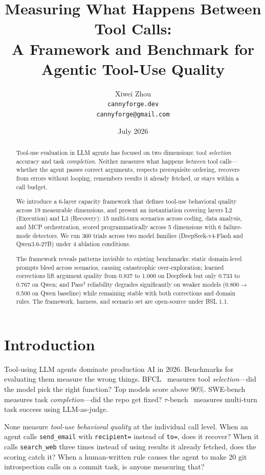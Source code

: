 \documentclass[11pt]{article}
\title{\textbf{Measuring What Happens Between Tool Calls:} \\
       \large A Framework and Benchmark for Agentic Tool-Use Quality}
\author{Xiwei Zhou \\
        \texttt{cannyforge.dev} \\
        \texttt{cannyforge@gmail.com}}
\date{July 2026}
\begin{document}
\maketitle

\begin{abstract}
Tool-use evaluation in LLM agents has focused on two dimensions: tool
\emph{selection} accuracy and task \emph{completion}. Neither measures what
happens \emph{between} tool calls---whether the agent passes correct arguments,
respects prerequisite ordering, recovers from errors without looping, remembers
results it already fetched, or stays within a call budget.

We introduce a 6-layer capacity framework that defines tool-use behavioral
quality across 19 measurable dimensions, and present an instantiation covering
layers L2 (Execution) and L3 (Recovery): 15 multi-turn scenarios across coding,
data analysis, and MCP orchestration, scored programmatically across 5
dimensions with 6 failure-mode detectors. We run 360 trials across two model
families (DeepSeek-v4-Flash and Qwen3.6-27B) under 4 ablation conditions.

The framework reveals patterns invisible to existing benchmarks: static
domain-level prompts bleed across scenarios, causing catastrophic
over-exploration; learned corrections lift argument quality from 0.837 to 1.000
on DeepSeek but only 0.733 to 0.767 on Qwen; and Pass$^3$ reliability
degrades significantly on weaker models (0.800$\rightarrow$0.500 on Qwen
baseline) while remaining stable with both corrections and domain rules. The
framework, harness, and scenario set are open-source under BSL 1.1.
\end{abstract}

\section{Introduction}

Tool-using LLM agents dominate production AI in 2026. Benchmarks for
evaluating them measure the wrong things. BFCL~\cite{bfcl} measures tool
\emph{selection}---did the model pick the right function? Top models score
above 90\%. SWE-bench~\cite{swebench} measures task \emph{completion}---did
the repo get fixed? $\tau$-bench~\cite{taubench} measures multi-turn task
success using LLM-as-judge.

None measure \emph{tool-use behavioral quality} at the individual call level.
When an agent calls \texttt{send\_email} with \texttt{recipient=} instead of
\texttt{to=}, does it recover? When it calls \texttt{search\_web} three times
instead of using results it already fetched, does the scoring catch it? When a
human-written rule causes the agent to make 20 git introspection calls on a
commit task, is anyone measuring that?
\end{document}
